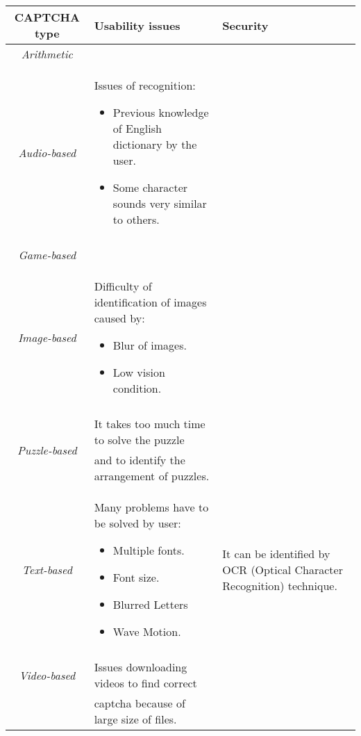 \begin{table}
\centering \footnotesize
\renewcommand*\arraystretch{1.3}
\begin{tabular}{cll}
\hline
{\textbf{CAPTCHA type}} & {\textbf{Usability issues}} & {\textbf{Security}}\\
\hline
\textit{Arithmetic} & {} & {}\\
\hline
\textit{Audio-based} & {
  \begin{minipage} [t] {0.4\textwidth}
  Issues of recognition:
      \begin{itemize}
        \item{Previous knowledge of English dictionary by the user.}
        \item{Some character sounds very similar to others.}
       \end{itemize} 
  \end{minipage}
} & {}\\
\tabularnewline
\hline
\textit{Game-based} & {} & {}\\
\hline
\textit{Image-based} & {
 \begin{minipage} [t] {0.4\textwidth}
Difficulty of identification of images caused by:
      \begin{itemize}
        \item{Blur of images.}
        \item{Low vision condition.}
       \end{itemize} 
  \end{minipage}
} & {}\\
\tabularnewline
\hline
\multirow{2}{*}{\textit{Puzzle-based}} & {It takes too much time to solve the puzzle} & {}\\
{} & {and to identify the arrangement of puzzles.} & {}\\
\hline
\textit{Text-based} & {
  \begin{minipage} [t] {0.4\textwidth}
	Many problems have to be solved by user:
      \begin{itemize}
        \item{Multiple fonts.}
        \item{Font size.}
        \item{Blurred Letters}
        \item{Wave Motion.}
       \end{itemize} 
  \end{minipage}
}
& {It can be identified by OCR (Optical Character Recognition) technique.}\\
\tabularnewline
\hline
\textit{Video-based} & {
Issues downloading videos to find correct} & {}\\
{} & {captcha because of large size of files.} & {}\\

\end{tabular}
\end{table}